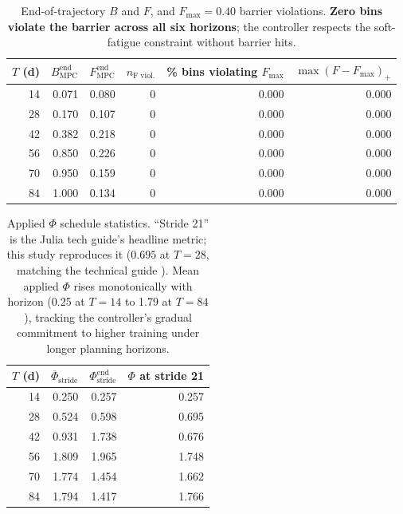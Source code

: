 \documentclass[11pt,a4paper]{article}
\begin{document}
\begin{table}[ht]
\centering
\small
\begin{tabular}{rrrrrr}
\toprule
$T$ (d) & $B^{\mathrm{end}}_{\mathrm{MPC}}$ & $F^{\mathrm{end}}_{\mathrm{MPC}}$ & $n_{\mathrm{F\;viol.}}$ & \% bins violating $F_{\max}$ & $\max(F - F_{\max})_+$ \\
\midrule
14 & 0.071 & 0.080 & 0 & 0.000 & 0.000 \\
28 & 0.170 & 0.107 & 0 & 0.000 & 0.000 \\
42 & 0.382 & 0.218 & 0 & 0.000 & 0.000 \\
56 & 0.850 & 0.226 & 0 & 0.000 & 0.000 \\
70 & 0.950 & 0.159 & 0 & 0.000 & 0.000 \\
84 & 1.000 & 0.134 & 0 & 0.000 & 0.000 \\
\bottomrule
\end{tabular}
\caption{End-of-trajectory $B$ and $F$, and $F_{\max} = 0.40$ barrier
violations. \textbf{Zero bins violate the barrier across all six
horizons}; the controller respects the soft-fatigue constraint
without barrier hits.}
\label{tab:BF_summary}
\end{table}

\begin{table}[ht]
\centering
\small
\begin{tabular}{rrrr}
\toprule
$T$ (d) & $\overline{\Phi}_{\mathrm{stride}}$ & $\Phi^{\mathrm{end}}_{\mathrm{stride}}$ & $\Phi$ at stride 21 \\
\midrule
14 & 0.250 & 0.257 & 0.257 \\
28 & 0.524 & 0.598 & 0.695 \\
42 & 0.931 & 1.738 & 0.676 \\
56 & 1.809 & 1.965 & 1.748 \\
70 & 1.774 & 1.454 & 1.662 \\
84 & 1.794 & 1.417 & 1.766 \\
\bottomrule
\end{tabular}
\caption{Applied $\Phi$ schedule statistics. ``Stride 21'' is the
Julia tech guide's headline metric; this study reproduces it
($0.695$ at $T=28$, matching the technical guide
\cite{techguide}). Mean applied $\Phi$ rises monotonically with
horizon (0.25 at $T=14$ to 1.79 at $T=84$), tracking the controller's
gradual commitment to higher training under longer planning
horizons.}
\label{tab:phi_summary}
\end{table}

\clearpage
\end{document}

